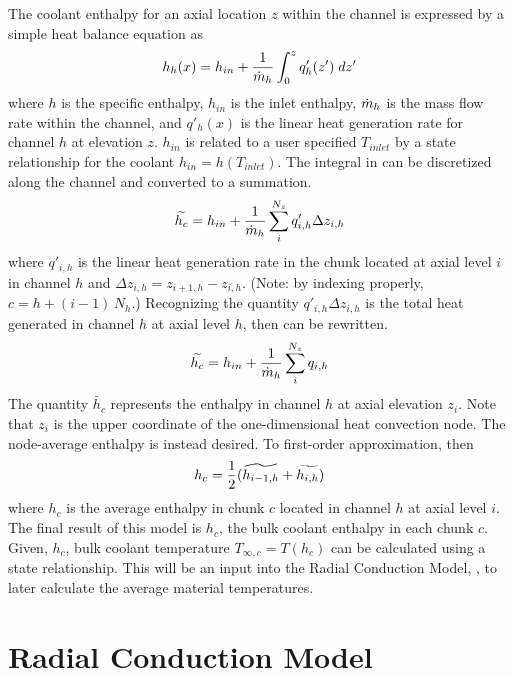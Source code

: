   The coolant enthalpy for an axial location $z$ within the channel is expressed
  by a simple heat balance equation as
  \begin{equation}
    \label{eq:continuous_heat_balance}
    h_h(x) = h_{in} + \frac{1}{\dot{m}_h} \int_0^z q'_h(z') \; dz'
  \end{equation}
  where $h$ is the specific enthalpy, $h_{in}$ is the inlet enthalpy, $\dot{m}_h$
  is the mass flow rate within the channel, and $q'_h(x)$ is the linear heat 
  generation rate for channel $h$ at elevation $z$. $h_{in}$ is related to a
  user specified 
  $T_{inlet}$ by a state relationship for the coolant $h_{in} = h(T_{inlet})$.
  The integral in  can be discretized along the
  channel and converted to a summation.
  \begin{equation}
    \label{eq:heat_balance}
    \widetilde{h_c} = 
      h_{in} + \frac{1}{\dot{m}_h} \sum_{i}^{N_z} q'_{i,h} \Delta z_{i,h}
  \end{equation}
  where $q'_{i,h}$ is the linear heat generation rate in the chunk located at 
  axial level $i$ in 
  channel $h$ and $\Delta z_{i,h} = z_{i+1,h} - z_{i,h}$. (Note: by indexing
  properly, $c = h + (i-1) \, N_h$.) Recognizing the 
  quantity $q'_{i,h} \Delta z_{i,h}$ is the total heat generated in channel $h$ 
  at axial level $h$, then  can be rewritten.
  \begin{equation}
    \widetilde{h_c} = h_{in} + \frac{1}{\dot{m}_h} \sum_i^{N_z} q_{i,h}
  \end{equation}
  The quantity $\widetilde{h_c}$ represents the enthalpy in channel $h$ at axial
  elevation $z_i$. Note that $z_i$ is the upper coordinate of the
  one-dimensional heat convection node. The node-average enthalpy is instead
  desired. To first-order approximation, then
  \begin{equation}
    h_c = \frac{1}{2} (\widetilde{h_{i-1,h}} + \widetilde{h_{i,h}})
  \end{equation}
  where $h_c$ is the average enthalpy in chunk $c$ located in channel $h$ at
  axial level $i$.
  The final result of this model is $h_c$, the bulk coolant enthalpy in each
  chunk $c$. Given, $h_c$, bulk coolant temperature $T_{\infty,c} = T(h_c)$ can
  be calculated using a state relationship. This will be an input into the 
  Radial Conduction Model, , to later 
  calculate the average material temperatures.
  
\section{Radial Conduction Model}
  \label{sec:radial_conduction_model}
